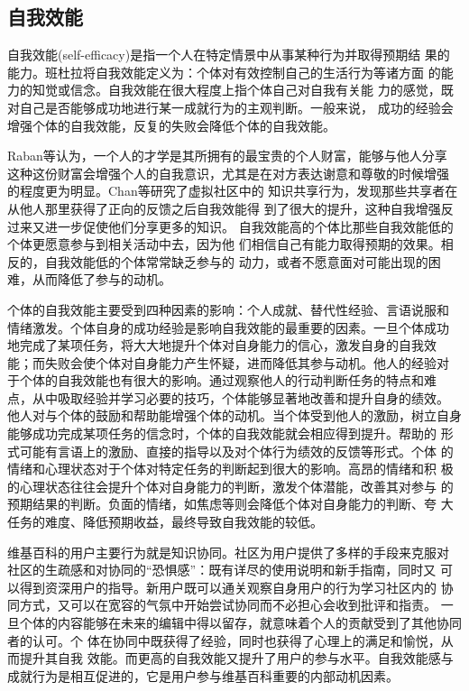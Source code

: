 \subsection{自我效能}
\label{sec:self-efficacy}

自我效能(self-efficacy)是指一个人在特定情景中从事某种行为并取得预期结
果的能力。班杜拉将自我效能定义为：个体对有效控制自己的生活行为等诸方面
的能力的知觉或信念\cite{bundura1977slt}。自我效能在很大程度上指个体自己对自我有关能
力的感觉，既对自己是否能够成功地进行某一成就行为的主观判断。一般来说，
成功的经验会增强个体的自我效能，反复的失败会降低个体的自我效能。

Raban等认为，一个人的才学是其所拥有的最宝贵的个人财富，能够与他人分享
这种这份财富会增强个人的自我意识，尤其是在对方表达谢意和尊敬的时候增强
的程度更为明显\cite{raban2007investigating}。Chan等研究了虚拟社区中的
知识共享行为，发现那些共享者在从他人那里获得了正向的反馈之后自我效能得
到了很大的提升，这种自我增强反过来又进一步促使他们分享更多的知识\cite{10.1109/HICSS.2004.1265460}。
自我效能高的个体比那些自我效能低的个体更愿意参与到相关活动中去，因为他
们相信自己有能力取得预期的效果。相反的，自我效能低的个体常常缺乏参与的
动力，或者不愿意面对可能出现的困难，从而降低了参与的动机。

个体的自我效能主要受到四种因素的影响：个人成就、替代性经验、言语说服和
情绪激发。个体自身的成功经验是影响自我效能的最重要的因素。一旦个体成功
地完成了某项任务，将大大地提升个体对自身能力的信心，激发自身的自我效
能；而失败会使个体对自身能力产生怀疑，进而降低其参与动机。他人的经验对
于个体的自我效能也有很大的影响。通过观察他人的行动判断任务的特点和难
点，从中吸取经验并学习必要的技巧，个体能够显著地改善和提升自身的绩效。
他人对与个体的鼓励和帮助能增强个体的动机。当个体受到他人的激励，树立自身
能够成功完成某项任务的信念时，个体的自我效能就会相应得到提升。帮助的
形式可能有言语上的激励、直接的指导以及对个体行为绩效的反馈等形式。个体
的情绪和心理状态对于个体对特定任务的判断起到很大的影响。高昂的情绪和积
极的心理状态往往会提升个体对自身能力的判断，激发个体潜能，改善其对参与
的预期结果的判断。负面的情绪，如焦虑等则会降低个体对自身能力的判断、夸
大任务的难度、降低预期收益，最终导致自我效能的较低。

维基百科的用户主要行为就是知识协同。社区为用户提供了多样的手段来克服对
社区的生疏感和对协同的“恐惧感”：既有详尽的使用说明和新手指南，同时又
可以得到资深用户的指导。新用户既可以通关观察自身用户的行为学习社区内的
协同方式，又可以在宽容的气氛中开始尝试协同而不必担心会收到批评和指责。
一旦个体的内容能够在未来的编辑中得以留存，就意味着个人的贡献受到了其他协同者的认可。个
体在协同中既获得了经验，同时也获得了心理上的满足和愉悦，从而提升其自我
效能。而更高的自我效能又提升了用户的参与水平。自我效能感与成就行为是相互促进的，它是用户参与维基百科重要的内部动机因素。

